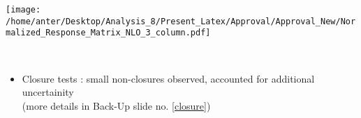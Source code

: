 \begin{frame}
\begin{minipage}[tbp]{0.2\textwidth}
\begin{center}
\texttt{[image: /home/anter/Desktop/Analysis\_8/Present\_Latex/Approval/Approval\_New/Normalized\_Response\_Matrix\_NLO\_3\_column.pdf]} \\
\end{center}
\end{minipage} 
\\
\begin{center}
\begin{itemize}
\item {\scriptsize Closure tests : small non-closures observed, accounted for additional uncertainity \\ 
(more details in Back-Up slide no. \ref{closure}) \\ }
\end{itemize}
\end{center}
\end{frame}

